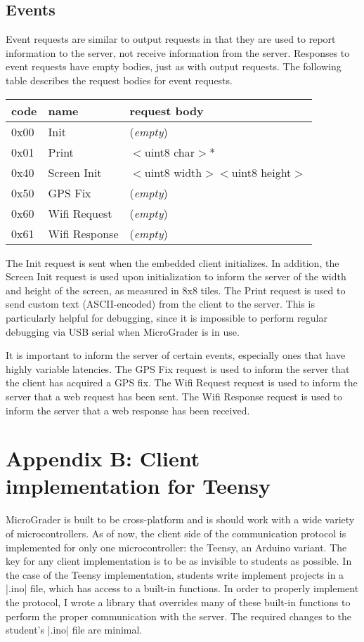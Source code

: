 \documentclass[12pt]{article}
\begin{document}
\subsection{Events}
Event requests are similar to output requests in that they are used to report information to the server, not receive information from the server.  Responses to event requests have empty bodies, just as with output requests.  The following table describes the request bodies for event requests.

\begin{center}
\begin{tabular}{l l l}
code & name & request body \\ \hline
0x00 & Init & (\textit{empty}) \\
0x01 & Print & $<$uint8 char$>$* \\
0x40 & Screen Init & $<$uint8 width$>$$<$uint8 height$>$ \\
0x50 & GPS Fix & (\textit{empty}) \\
0x60 & Wifi Request & (\textit{empty}) \\
0x61 & Wifi Response & (\textit{empty}) \\ \hline
\end{tabular}
\end{center}

\vspace{5mm}

The Init request is sent when the embedded client initializes.  In addition, the Screen Init request is used upon initialization to inform the server of the width and height of the screen, as measured in 8x8 tiles.  The Print request is used to send custom text (ASCII-encoded) from the client to the server.  This is particularly helpful for debugging, since it is impossible to perform regular debugging via USB serial when MicroGrader is in use.

It is important to inform the server of certain events, especially ones that have highly variable latencies.  The GPS Fix request is used to inform the server that the client has acquired a GPS fix.  The Wifi Request request is used to inform the server that a web request has been sent.  The Wifi Response request is used to inform the server that a web response has been received.

\newpage
\section{Appendix B: Client implementation for Teensy}
\label{sec:teensy}
MicroGrader is built to be cross-platform and is should work with a wide variety of microcontrollers.  As of now, the client side of the communication protocol is implemented for only one microcontroller: the Teensy, an Arduino variant.  The key for any client implementation is to be as invisible to students as possible.  In the case of the Teensy implementation, students write implement projects in a |.ino| file, which has access to a built-in functions.  In order to properly implement the protocol, I wrote a library that overrides many of these built-in functions to perform the proper communication with the server.  The required changes to the student's |.ino| file are minimal.
\end{document}
